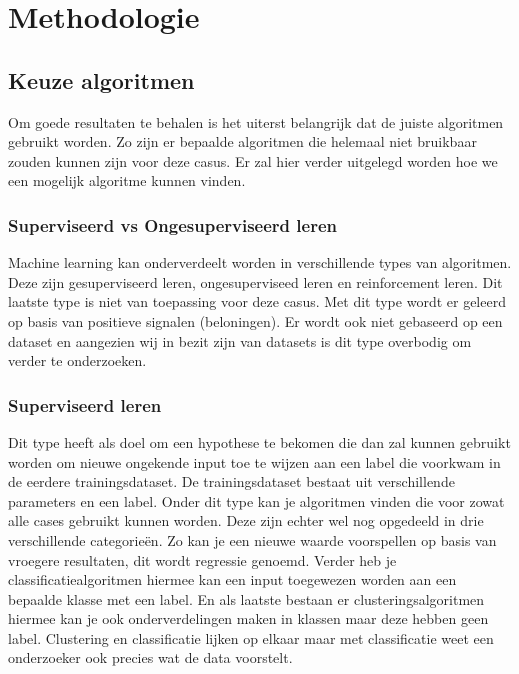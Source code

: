 
\chapter{Methodologie}
\label{ch:methodologie}



\section{Keuze algoritmen}
\label{sec:keuze-algoritmen}
Om goede resultaten te behalen is het uiterst belangrijk dat de juiste algoritmen gebruikt worden. Zo zijn er bepaalde algoritmen die helemaal niet bruikbaar zouden kunnen zijn voor deze casus. Er zal hier verder uitgelegd worden hoe we een mogelijk algoritme kunnen vinden.

\subsection{Superviseerd vs Ongesuperviseerd leren}
\label{sec: superviseerd-vs-ongesuperviseerd-leren}
Machine learning kan onderverdeelt worden in verschillende types van algoritmen. Deze zijn gesuperviseerd leren, ongesuperviseed leren en reinforcement leren. Dit laatste type is niet van toepassing voor deze casus. Met dit type wordt er geleerd op basis van positieve signalen (beloningen). Er wordt ook niet gebaseerd op een dataset en aangezien wij in bezit zijn van datasets is dit type overbodig om verder te onderzoeken. 

\subsection*{Superviseerd leren}
\label{sec: superviseerd-leren}
Dit type heeft als doel om een hypothese te bekomen die dan zal kunnen gebruikt worden om nieuwe ongekende input toe te wijzen aan een label die voorkwam in de eerdere trainingsdataset. De trainingsdataset bestaat uit verschillende parameters en een label. Onder dit type kan je algoritmen vinden die voor zowat alle cases gebruikt kunnen worden. Deze zijn echter wel nog opgedeeld in drie verschillende categorieën. Zo kan je een nieuwe waarde voorspellen op basis van vroegere resultaten, dit wordt regressie genoemd. Verder heb je classificatiealgoritmen hiermee kan een input toegewezen worden aan een bepaalde klasse met een label. En als laatste bestaan er clusteringsalgoritmen hiermee kan je ook onderverdelingen maken in klassen maar deze hebben geen label. Clustering en classificatie lijken op elkaar maar met classificatie weet een onderzoeker ook precies wat de data voorstelt. 

